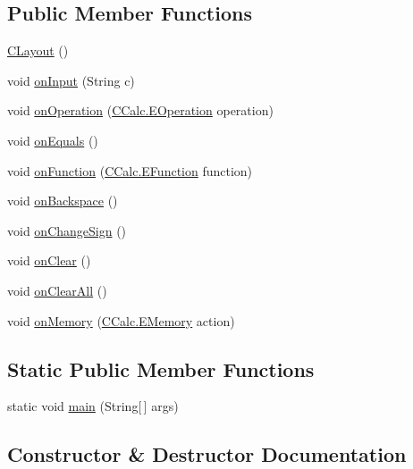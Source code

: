 \subsection*{Public Member Functions}
\begin{DoxyCompactItemize}
\item 
\hyperlink{class_c_layout_a067db89587d8cf8f0a65b4e22e078614}{C\+Layout} ()
\item 
void \hyperlink{class_c_layout_a4c804c4661ecbe21ff3c329b52685f2e}{on\+Input} (String c)
\item 
void \hyperlink{class_c_layout_a79ab3f38d6180d3d8128a8df56a286e4}{on\+Operation} (\hyperlink{enum_c_calc_1_1_e_operation}{C\+Calc.\+E\+Operation} operation)
\item 
void \hyperlink{class_c_layout_a0eeec8438e80cee6dd854d294f0b0a83}{on\+Equals} ()
\item 
void \hyperlink{class_c_layout_a66158850e5e46ef601b1d9d4b930515b}{on\+Function} (\hyperlink{enum_c_calc_1_1_e_function}{C\+Calc.\+E\+Function} function)
\item 
void \hyperlink{class_c_layout_a54b6abd19bbb8e2460ac7f402d0c3076}{on\+Backspace} ()
\item 
void \hyperlink{class_c_layout_a243c235ebfa64c2b9647cfa1e0bb494c}{on\+Change\+Sign} ()
\item 
void \hyperlink{class_c_layout_a863a211f91242e5d8f2181d5c11e0a4e}{on\+Clear} ()
\item 
void \hyperlink{class_c_layout_a8ed49c0c6182d760726c6e76aa57a947}{on\+Clear\+All} ()
\item 
void \hyperlink{class_c_layout_adf8b0e63eed029a1feea4f1d008dd1ee}{on\+Memory} (\hyperlink{enum_c_calc_1_1_e_memory}{C\+Calc.\+E\+Memory} action)
\end{DoxyCompactItemize}
\subsection*{Static Public Member Functions}
\begin{DoxyCompactItemize}
\item 
static void \hyperlink{class_c_layout_aabd188e34f444ec341c43ef393811129}{main} (String\mbox{[}$\,$\mbox{]} args)
\end{DoxyCompactItemize}


\subsection{Constructor \& Destructor Documentation}
